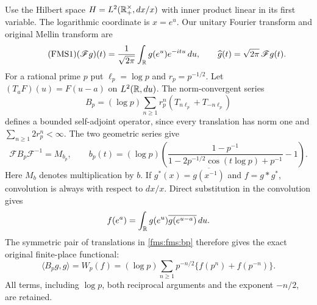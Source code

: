 Use the Hilbert space $H=L^2(\mathbb R_+^\times,dx/x)$ with inner product
linear in its first variable.  The logarithmic coordinate is $x=e^u$.
Our unitary Fourier transform and original Mellin transform are
\begin{equation}\tag{FMS1}\label{fms:fms:fourier}
 (\mathscr Fg)(t)=\frac1{\sqrt{2\pi}}\int_\mathbb R g(e^u)e^{-itu}\,du,
 \qquad \widehat g(t)=\sqrt{2\pi}\,\mathscr Fg(t).
\end{equation}
For a rational prime $p$ put $\ell_p=\log p$ and $r_p=p^{-1/2}$.
Let $(T_aF)(u)=F(u-a)$ on $L^2(\mathbb R,du)$.  The norm-convergent series
\begin{equation}\tag{FMS2}\label{fms:fms:bp}
 B_p=(\log p)\sum_{n\ge1}r_p^n(T_{n\ell_p}+T_{-n\ell_p})
\end{equation}
defines a bounded self-adjoint operator, since every translation has
norm one and $\sum_{n\ge1}2r_p^n<\infty$.  The two geometric series give
\begin{equation}\tag{FMS3}\label{fms:fms:multiplier}
 \mathscr FB_p\mathscr F^{-1}=M_{b_p},\qquad
 b_p(t)=(\log p)
 \left(\frac{1-p^{-1}}{1-2p^{-1/2}\cos(t\log p)+p^{-1}}-1\right).
\end{equation}
Here $M_b$ denotes multiplication by $b$.  If
$g^*(x)=\overline{g(x^{-1})}$ and $f=g*g^*$, convolution is always
with respect to $dx/x$.  Direct substitution in the convolution gives
\[
 f(e^a)=\int_\mathbb R g(e^u)\overline{g(e^{u-a})}\,du.
\]
The symmetric pair of translations in \eqref{fms:fms:bp} therefore gives
the exact original finite-place functional:
\begin{equation}\tag{FMS4}\label{fms:fms:local}
 \langle B_pg,g\rangle
 =W_p(f)
 =(\log p)\sum_{n\ge1}p^{-n/2}\{f(p^n)+f(p^{-n})\}.
\end{equation}
All terms, including $\log p$, both reciprocal arguments and the
exponent $-n/2$, are retained.

